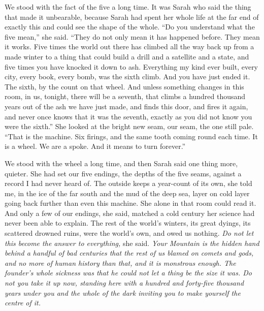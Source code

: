 We stood with the fact of the five a long time. It was Sarah who said the thing that made it unbearable, because Sarah had spent her whole life at the far end of exactly this and could see the shape of the whole. ``Do you understand what the five mean,'' she said. ``They do not only mean it has happened before. They mean it works. Five times the world out there has climbed all the way back up from a made winter to a thing that could build a drill and a satellite and a state, and five times you have knocked it down to ash. Everything my kind ever built, every city, every book, every bomb, was the sixth climb. And you have just ended it. The sixth, by the count on that wheel. And unless something changes in this room, in us, tonight, there will be a seventh, that climbs a hundred thousand years out of the ash we have just made, and finds this door, and fires it again, and never once knows that it was the seventh, exactly as you did not know you were the sixth.'' She looked at the bright new seam, our seam, the one still pale. ``That is the machine. Six firings, and the same tooth coming round each time. It is a wheel. We are a spoke. And it means to turn forever.''\par

We stood with the wheel a long time, and then Sarah said one thing more, quieter. She had set our five endings, the depths of the five seams, against a record I had never heard of. The outside keeps a year-count of its own, she told me, in the ice of the far south and the mud of the deep sea, layer on cold layer going back further than even this machine. She alone in that room could read it. And only a few of our endings, she said, matched a cold century her science had never been able to explain. The rest of the world's winters, its great dyings, its scattered drowned ruins, were the world's own, and owed us nothing. \emph{Do not let this become the answer to everything,} she said. \emph{Your Mountain is the hidden hand behind a handful of bad centuries that the rest of us blamed on comets and gods, and no more of human history than that, and it is monstrous enough. The founder's whole sickness was that he could not let a thing be the size it was. Do not you take it up now, standing here with a hundred and forty-five thousand years under you and the whole of the dark inviting you to make yourself the centre of it.}\par


